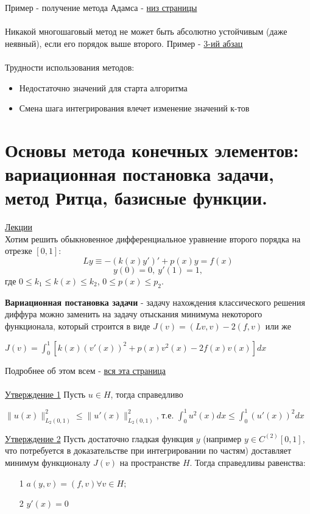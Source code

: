 \documentclass[specialist, subf, href, colorlinks=true, 12pt, times, mtpro, final]{disser}
\theoremstyle{definition}
\begin{document}
{    Пример - получение метода Адамса - \hyperlink {lects.92}{низ страницы}\\\\

    
    Никакой многошаговый метод не может быть абсолютно устойчивым (даже неявный), если его порядок выше второго. Пример - \hyperlink {lects.93}{3-ий абзац}\\
    \\
    Трудности использования методов: 
    \begin{itemize}
    \item Недостаточно значений для старта алгоритма
    \item Смена шага интегрирования влечет изменение значений к-тов
    \end{itemize}

\section {Основы метода конечных элементов: вариационная постановка задачи, метод Ритца, базисные функции.}
    \hyperlink {lects.97}{Лекции}\\
    Хотим решить обыкновенное дифференциальное уравнение второго порядка на отрезке $[0,1]$:
    $$
        Ly \equiv -(k(x)y')' + p(x) y =f(x)
    $$
    $$
        y(0) = 0, \ y'(1) = 1,
    $$
    где $0 \le k_1 \le k(x) \le k_2$, $0 \le p(x) \le p_2$.
    
    \textbf{Вариационная постановка задачи} - задачу нахождения классического решения диффура можно заменить на задачу отыскания минимума некоторого функционала, который строится в виде $J(v) = (Lv,v) - 2(f,v)$ или же
    \begin{center}
    $J(v) = \int^1_0 [k(x)(v'(x))^2 + p(x)v^2(x) - 2f(x)v(x)]dx$
    \end{center}
    Подробнее об этом всем - \hyperlink {lects.97}{вся эта страница}\\
    \\
    \hyperlink {lects.98}{Утверждение 1} Пусть $u \in H$,  тогда справедливо
    \begin{center}
    $\|u(x)\|^2_{L_2(0,1)} \leq \|u'(x)\|^2_{L_2(0,1)}$, т.е. $\int^1_0 u^2(x)dx \leq \int^1_0 (u'(x))^2dx$
    \end{center}
    
   \hyperlink {lects.98}{Утверждение 2}
    Пусть достаточно гладкая функция
     $y$ (например $y \in C^{(2)}[0,1]$, что потребуется в доказательстве при интегрировании по частям) доставляет минимум функционалу $J(v)$ на пространстве $H$.  Тогда справедливы равенства:
    \begin{itemize}
    \item[1] $a(y,v) = (f,v) \forall v \in H;$
    \item[2]$y'(x) = 0$
    \end{itemize}
    
}
\end{document}
